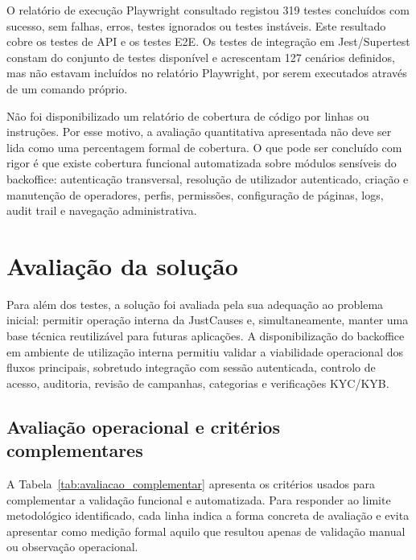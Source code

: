 O relatório de execução Playwright consultado registou 319 testes concluídos com sucesso, sem falhas, erros, testes ignorados ou testes instáveis. Este resultado cobre os testes de \gls{API} e os testes \gls{E2E}. Os testes de integração em Jest/Supertest constam do conjunto de testes disponível e acrescentam 127 cenários definidos, mas não estavam incluídos no relatório Playwright, por serem executados através de um comando próprio.

Não foi disponibilizado um relatório de cobertura de código por linhas ou instruções. Por esse motivo, a avaliação quantitativa apresentada não deve ser lida como uma percentagem formal de cobertura. O que pode ser concluído com rigor é que existe cobertura funcional automatizada sobre módulos sensíveis do backoffice: autenticação transversal, resolução de utilizador autenticado, criação e manutenção de operadores, perfis, permissões, configuração de páginas, logs, audit trail e navegação administrativa.


\section{Avaliação da solução}
\label{sec:avaliacao}

Para além dos testes, a solução foi avaliada pela sua adequação ao problema inicial: permitir operação interna da JustCauses e, simultaneamente, manter uma base técnica reutilizável para futuras aplicações. A disponibilização do backoffice em ambiente de utilização interna permitiu validar a viabilidade operacional dos fluxos principais, sobretudo integração com sessão autenticada, controlo de acesso, auditoria, revisão de campanhas, categorias e verificações KYC/KYB.

\subsection{Avaliação operacional e critérios complementares}
\label{subsec:avaliacao_complementar}

A Tabela~\ref{tab:avaliacao_complementar} apresenta os critérios usados para complementar a validação funcional e automatizada. Para responder ao limite metodológico identificado, cada linha indica a forma concreta de avaliação e evita apresentar como medição formal aquilo que resultou apenas de validação manual ou observação operacional.

